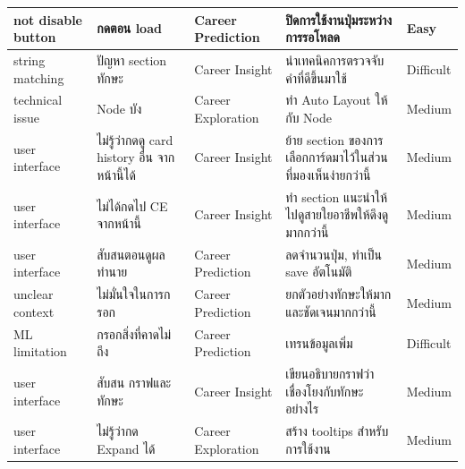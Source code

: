 \begin{enumerate}
\begin{table}[H]
\begin{tabularx}{\textwidth}{|l|X|l|X|l|}
        not disable button  & กดตอน load                                    & Career Prediction  & ปิดการใช้งานปุ่มระหว่างการรอโหลด                              & Easy                    \\ \hline
        string matching     & ปัญหา section ทักษะ                           & Career Insight     & นำเทคนิคการตรวจจับคำที่ดีขึ้นมาใช้                            & Difficult               \\ \hline
        technical issue     & Node บัง                                       & Career Exploration & ทำ Auto Layout ให้กับ Node                                    & Medium                  \\ \hline
        user interface      & ไม่รู้ว่ากดดู card history อื่น จากหน้านี้ได้  & Career Insight     & ย้าย section ของการเลือกการ์ดมาไว้ในส่วนที่มองเห็นง่ายกว่านี้ & Medium                  \\ \hline
        user interface      & ไม่ได้กดไป CE จากหน้านี้                      & Career Insight     & ทำ section แนะนำให้ไปดูสายใยอาชีพให้ดึงดูมากกว่านี้           & Medium                  \\ \hline
        user interface      & สับสนตอนดูผลทำนาย                              & Career Prediction  & ลดจำนวนปุ่ม, ทำเป็น save อัตโนมัติ                            & Medium                  \\ \hline
        unclear context     & ไม่มั่นใจในการกรอก                           & Career Prediction  & ยกตัวอย่างทักษะให้มากและชัดเจนมากกว่านี้                      & Medium                  \\ \hline
        ML limitation       & กรอกสิ่งที่คาดไม่ถึง                        & Career Prediction  & เทรนข้อมูลเพิ่ม                                               & Difficult               \\ \hline
        user interface      & สับสน กราฟและทักษะ                           & Career Insight     & เขียนอธิบายกราฟว่าเชื่องโยงกับทักษะอย่างไร                    & Medium                  \\ \hline
        user interface      & ไม่รู้ว่ากด Expand ได้                     & Career Exploration & สร้าง tooltips สำหรับการใช้งาน                                & Medium                  \\ \hline
        \end{tabularx}
        \end{table}
\end{enumerate}

